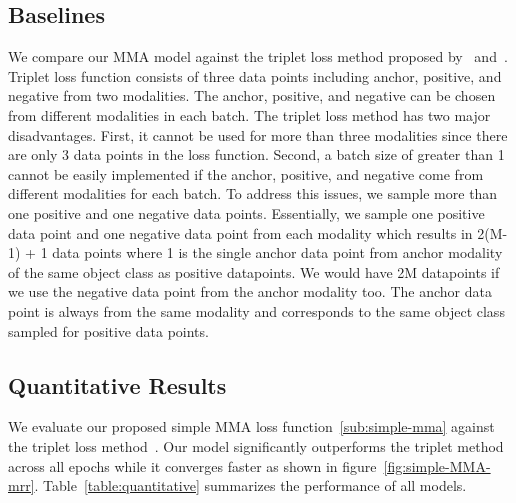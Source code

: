 \documentclass[11pt]{article}
\begin{document}
\subsection{Baselines}
We compare our MMA model against the triplet loss method proposed by~\citet{GoLD_UMBC} and~\citet{triplet_loss_2021_CVPR}. Triplet loss function consists of three data points including anchor, positive, and negative from two modalities. The anchor, positive, and negative can be chosen from different modalities in each batch.
The triplet loss method has two major disadvantages. First, it cannot be used for more than three modalities since there are only 3 data points in the loss function. Second, a batch size of greater than 1 cannot be easily implemented if the anchor, positive, and negative come from different modalities for each batch.
To address this issues, we sample more than one positive and one negative data points. Essentially, we sample one positive data point and one negative data point from each modality which results in 2(M-1) + 1 data points where 1 is the single anchor data point from anchor modality of the same object class as positive datapoints. We would have 2M datapoints if we use the negative data point from the anchor modality too. The anchor data point is always from the same modality and corresponds to the same object class sampled for positive data points.

\subsection{Quantitative Results}
\label{sec:Quantitative}

We evaluate our proposed simple MMA loss function~\ref{sub:simple-mma} against the triplet loss method~\cite{triplet_loss_2021_CVPR}. Our model significantly outperforms the triplet method across all epochs while it converges faster as shown in figure~\ref{fig:simple-MMA-mrr}.
Table~\ref{table:quantitative} summarizes the performance of all models.
\end{document}
